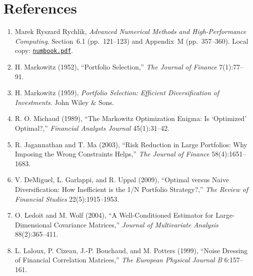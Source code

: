 \documentclass[11pt]{article}
\begin{document}
	\section{References}
	\begin{enumerate}
		\item Marek Ryszard Rychlik, \emph{Advanced Numerical Methods and High-Performance Computing}. Section~6.1 (pp.~121--123) and Appendix~M (pp.~357--360). Local copy: \href{numbook.pdf}{\texttt{numbook.pdf}}.
		\item H. Markowitz (1952), ``Portfolio Selection,'' \emph{The Journal of Finance} 7(1):77--91.
		\item H. Markowitz (1959), \emph{Portfolio Selection: Efficient Diversification of Investments}. John Wiley \& Sons.
		\item R. O. Michaud (1989), ``The Markowitz Optimization Enigma: Is ‘Optimized’ Optimal?,'' \emph{Financial Analysts Journal} 45(1):31--42.
		\item R. Jagannathan and T. Ma (2003), ``Risk Reduction in Large Portfolios: Why Imposing the Wrong Constraints Helps,'' \emph{The Journal of Finance} 58(4):1651--1683.
		\item V. DeMiguel, L. Garlappi, and R. Uppal (2009), ``Optimal versus Naive Diversification: How Inefficient is the 1/N Portfolio Strategy?,'' \emph{The Review of Financial Studies} 22(5):1915--1953.
		\item O. Ledoit and M. Wolf (2004), ``A Well-Conditioned Estimator for Large-Dimensional Covariance Matrices,'' \emph{Journal of Multivariate Analysis} 88(2):365--411.
		\item L. Laloux, P. Cizeau, J.-P. Bouchaud, and M. Potters (1999), ``Noise Dressing of Financial Correlation Matrices,'' \emph{The European Physical Journal B} 6:157--161.
	\end{enumerate}
	
\end{document}
